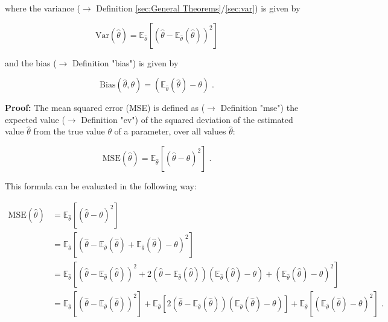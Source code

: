 \documentclass[a4paper,12pt]{book}
\begin{document}
where the variance ($\rightarrow$ Definition \ref{sec:General Theorems}/\ref{sec:var}) is given by

\begin{equation} \label{eq:mse-bnv-Var}
\mathrm{Var}(\hat{\theta}) = \mathbb{E}_{\hat{\theta}}\left[ \left( \hat{\theta} - \mathbb{E}_{\hat{\theta}}(\hat{\theta}) \right)^2 \right]
\end{equation}

and the bias ($\rightarrow$ Definition "bias") is given by

\begin{equation} \label{eq:mse-bnv-Bias}
\mathrm{Bias}(\hat{\theta},\theta) = \left( \mathbb{E}_{\hat{\theta}}(\hat{\theta}) - \theta \right) \; .
\end{equation}


\vspace{1em}
\textbf{Proof:} The mean squared error (MSE) is defined as ($\rightarrow$ Definition "mse") the expected value ($\rightarrow$ Definition "ev") of the squared deviation of the estimated value $\hat{\theta}$ from the true value $\theta$ of a parameter, over all values $\hat{\theta}$:

\begin{equation} \label{eq:mse-bnv-MSE-def}
\mathrm{MSE}(\hat{\theta}) = \mathbb{E}_{\hat{\theta}}\left[ \left( \hat{\theta} - \theta \right)^2 \right] \; .
\end{equation}

This formula can be evaluated in the following way:

\begin{equation} \label{eq:mse-bnv-MSE-ref1}
\begin{split}
\mathrm{MSE}(\hat{\theta}) &= \mathbb{E}_{\hat{\theta}}\left[ \left( \hat{\theta} - \theta \right)^2 \right] \\
&= \mathbb{E}_{\hat{\theta}}\left[ \left( \hat{\theta} - \mathbb{E}_{\hat{\theta}}(\hat{\theta}) + \mathbb{E}_{\hat{\theta}}(\hat{\theta}) - \theta \right)^2 \right] \\
&= \mathbb{E}_{\hat{\theta}}\left[ \left( \hat{\theta} - \mathbb{E}_{\hat{\theta}}(\hat{\theta}) \right)^2 + 2 \left( \hat{\theta} - \mathbb{E}_{\hat{\theta}}(\hat{\theta}) \right) \left( \mathbb{E}_{\hat{\theta}}(\hat{\theta}) - \theta \right) + \left( \mathbb{E}_{\hat{\theta}}(\hat{\theta}) - \theta \right)^2 \right] \\
&= \mathbb{E}_{\hat{\theta}}\left[ \left( \hat{\theta} - \mathbb{E}_{\hat{\theta}}(\hat{\theta}) \right)^2 \right] + \mathbb{E}_{\hat{\theta}}\left[ 2 \left( \hat{\theta} - \mathbb{E}_{\hat{\theta}}(\hat{\theta}) \right) \left( \mathbb{E}_{\hat{\theta}}(\hat{\theta}) - \theta \right) \right] + \mathbb{E}_{\hat{\theta}}\left[ \left( \mathbb{E}_{\hat{\theta}}(\hat{\theta}) - \theta \right)^2 \right] \; . \\
\end{split}
\end{equation}
\end{document}
